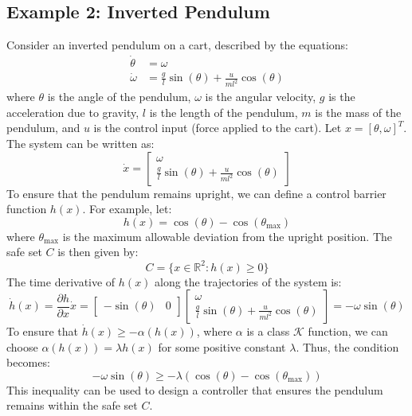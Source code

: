 \documentclass[12pt]{article}
\begin{document}
\subsection{Example 2: Inverted Pendulum}
Consider an inverted pendulum on a cart, described by the equations:
\[
\begin{aligned}
\dot{\theta} &= \omega \\
\dot{\omega} &= \frac{g}{l} \sin(\theta) + \frac{u}{ml^2} \cos(\theta)
\end{aligned}
\]
where \( \theta \) is the angle of the pendulum, \( \omega \) is the angular velocity, \( g \) is the acceleration due to gravity, \( l \) is the length of the pendulum, \( m \) is the mass of the pendulum, and \( u \) is the control input (force applied to the cart). Let \( x = [\theta, \omega]^T \). The system can be written as:
\[
\dot{x} = \begin{bmatrix}
\omega \\
\frac{g}{l} \sin(\theta) + \frac{u}{ml^2} \cos(\theta)
\end{bmatrix}
\]
To ensure that the pendulum remains upright, we can define a control barrier function \( h(x) \). For example, let:
\[
h(x) = \cos(\theta) - \cos(\theta_{\max})
\]
where \( \theta_{\max} \) is the maximum allowable deviation from the upright position. The safe set \( C \) is then given by:
\[
C = \{ x \in \mathbb{R}^2 : h(x) \geq 0 \}
\]
The time derivative of \( h(x) \) along the trajectories of the system is:
\[
\dot{h}(x) = \frac{\partial h}{\partial x} \dot{x} = \begin{bmatrix}
-\sin(\theta) & 0
\end{bmatrix} \begin{bmatrix}
\omega \\
\frac{g}{l} \sin(\theta) + \frac{u}{ml^2} \cos(\theta)
\end{bmatrix} = -\omega \sin(\theta)
\]
To ensure that \( \dot{h}(x) \geq -\alpha(h(x)) \), where \( \alpha \) is a class \( \mathcal{K} \) function, we can choose \( \alpha(h(x)) = \lambda h(x) \) for some positive constant \( \lambda \). Thus, the condition becomes:
\[
-\omega \sin(\theta) \geq -\lambda (\cos(\theta) - \cos(\theta_{\max}))
\]
This inequality can be used to design a controller that ensures the pendulum remains within the safe set \( C \).
\end{document}
